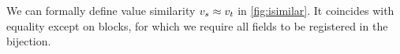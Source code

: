 \begin{mathpar}
\end{mathpar}

We can formally define value similarity $\datalangVal_s \iSimilar \datalangVal_t$ in \cref{fig:isimilar}.
It coincides with equality except on blocks, for which we require all fields to be registered in the bijection.




